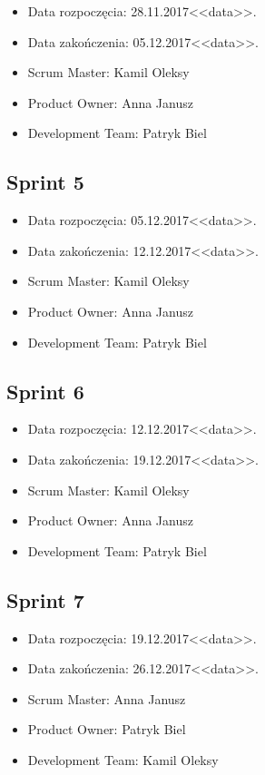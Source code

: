 \documentclass[a4paper]{article}
\begin{document}
\begin{itemize}
\item Data rozpoczęcia: 28.11.2017<<data>>.
\item  Data zakończenia: 05.12.2017<<data>>.
\item Scrum Master: Kamil Oleksy
\item Product Owner: Anna Janusz
\item Development Team: Patryk Biel
\end{itemize}

\subsection{Sprint 5}

\begin{itemize}
\item Data rozpoczęcia: 05.12.2017<<data>>.
\item  Data zakończenia: 12.12.2017<<data>>.
\item Scrum Master: Kamil Oleksy
\item Product Owner: Anna Janusz
\item Development Team: Patryk Biel
\end{itemize}

\subsection{Sprint 6}

\begin{itemize}
\item Data rozpoczęcia: 12.12.2017<<data>>.
\item  Data zakończenia: 19.12.2017<<data>>.
\item Scrum Master: Kamil Oleksy
\item Product Owner: Anna Janusz
\item Development Team: Patryk Biel
\end{itemize}


\subsection{Sprint 7}

\begin{itemize}
\item Data rozpoczęcia: 19.12.2017<<data>>.
\item  Data zakończenia: 26.12.2017<<data>>.
\item Scrum Master: Anna Janusz
\item Product Owner: Patryk Biel
\item Development Team: Kamil Oleksy
\end{itemize}
\end{document}
